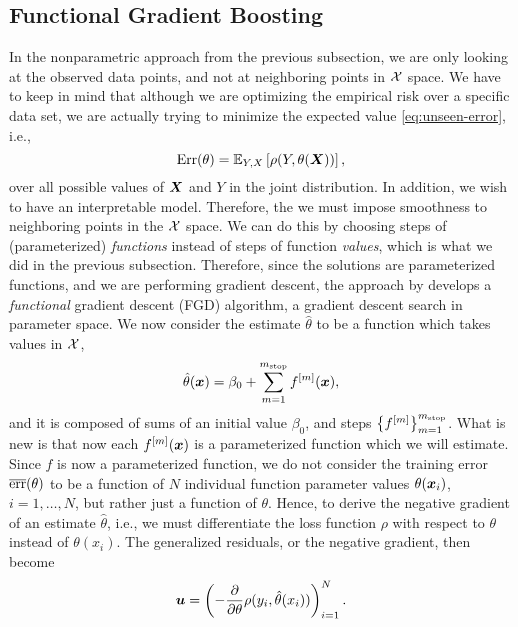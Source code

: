 \subsection{Functional Gradient Boosting}\label{sec:FGD}
In the nonparametric approach from the previous subsection, we are only looking at the observed data points, and not at neighboring points in $\mathcal{X}$ space.
We have to keep in mind that although we are optimizing the empirical risk over a specific data set, we are actually trying to minimize the expected value \eqref{eq:unseen-error}, i.e.,
\begin{equation*}
    \text{Err}(\theta)=\mathbb{E}_{Y,X}\left[\rho(Y,\theta(\bm{X}))\right],
\end{equation*}
over all possible values of $\bm{X}$ and $Y$ in the joint distribution.
In addition, we wish to have an interpretable model.
Therefore, the we must impose smoothness to neighboring points in the $\mathcal{X}$ space.
We can do this by choosing steps of (parameterized) \textit{functions} instead of steps of function \textit{values}, which is what we did in the previous subsection.
Therefore, since the solutions are parameterized functions, and we are performing gradient descent, the approach by \citet{friedman2001} develops a \textit{functional} gradient descent (FGD) algorithm, a gradient descent search in parameter space.
We now consider the estimate $\hat{\theta}$ to be a function which takes values in $\mathcal{X}$,
\begin{equation*}
    \hat{\theta}(\bm{x})=\beta_0+\sum_{m=1}^{m_{\text{stop}}}f^{[m]}(\bm{x}),
\end{equation*}
and it is composed of sums of an initial value $\beta_0$, and steps $\left\{f^{[m]}\right\}_{m=1}^{m_{\text{stop}}}$.
What is new is that now each $f^{[m]}(\bm{x})$ is a parameterized function which we will estimate.
Since $f$ is now a parameterized function, we do not consider the training error $\overline{\text{err}}(\theta)$ to be a function of $N$ individual function parameter values $\theta(\bm{x}_i)$, $i=1,\ldots,N$, but rather just a function of $\theta$.
Hence, to derive the negative gradient of an estimate $\hat{\theta}$, i.e., we must differentiate the loss function $\rho$ with respect to $\theta$ instead of $\theta(x_i)$.
The generalized residuals, or the negative gradient, then become
\begin{equation*}
    \bm{u}=\left(-\frac{\partial}{\partial \theta}\rho(y_i, \hat{\theta}(x_i))\right)_{i=1}^N.
\end{equation*}
